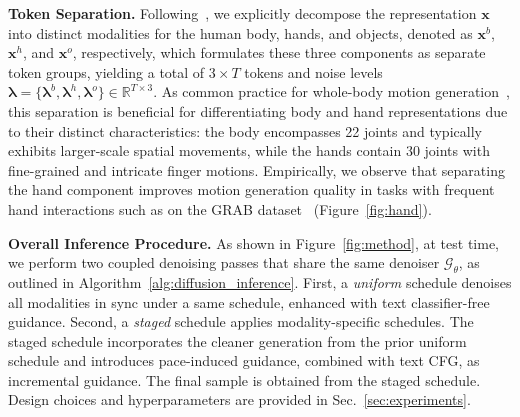 \noindent \textbf{Token Separation.}
Following~\citet{cha2024text2hoi}, we explicitly decompose the representation $\boldsymbol{x}$ into distinct modalities for the human body, hands, and objects, denoted as $\boldsymbol{x}^b$, $\boldsymbol{x}^h$, and $\boldsymbol{x}^o$, respectively, which formulates these three components as separate token groups, yielding a total of $3 \times T$ tokens and noise levels $
\boldsymbol{\lambda} = \{\boldsymbol\lambda^b, \boldsymbol\lambda^h, \boldsymbol\lambda^o\} \in \mathbb{R}^{T\times 3}
$. As common practice for whole-body motion generation~\citep{humantomato}, this separation is beneficial for differentiating body and hand representations due to their distinct characteristics: the body encompasses 22 joints and typically exhibits larger-scale spatial movements, while the hands contain 30 joints with fine-grained and intricate finger motions. Empirically, we observe that separating the hand component improves motion generation quality in tasks with frequent hand interactions such as on the GRAB dataset~\citep{taheri2020grab} (Figure~\ref{fig:hand}).

\noindent \textbf{Overall Inference Procedure.}
As shown in Figure~\ref{fig:method}, at test time, we perform two coupled denoising passes that share the same denoiser $\mathcal{G}_\theta$, as outlined in Algorithm~\ref{alg:diffusion_inference}.
First, a \emph{uniform} schedule denoises all modalities in sync under a same schedule, enhanced with text classifier-free guidance.
Second, a \emph{staged} schedule applies modality-specific schedules.
The staged schedule incorporates the cleaner generation from the prior uniform schedule and introduces pace-induced guidance, combined with text CFG, as incremental guidance.
The final sample is obtained from the staged schedule.
Design choices and hyperparameters are provided in Sec.~\ref{sec:experiments}.

